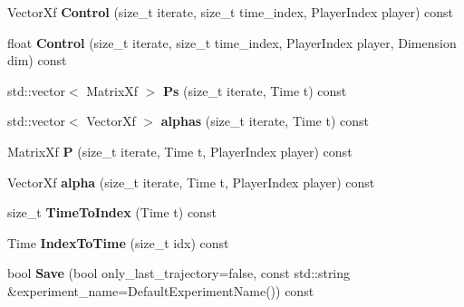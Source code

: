 \begin{DoxyCompactItemize}
\item 
Vector\+Xf {\bfseries Control} (size\+\_\+t iterate, size\+\_\+t time\+\_\+index, Player\+Index player) const \hypertarget{classilqgames_1_1_solver_log_a7bfdf2a7a7ced357eafcd36e009425d3}{}\label{classilqgames_1_1_solver_log_a7bfdf2a7a7ced357eafcd36e009425d3}

\item 
float {\bfseries Control} (size\+\_\+t iterate, size\+\_\+t time\+\_\+index, Player\+Index player, Dimension dim) const \hypertarget{classilqgames_1_1_solver_log_a73a740dd13e6f8c3c8359294e7662687}{}\label{classilqgames_1_1_solver_log_a73a740dd13e6f8c3c8359294e7662687}

\item 
std\+::vector$<$ Matrix\+Xf $>$ {\bfseries Ps} (size\+\_\+t iterate, Time t) const \hypertarget{classilqgames_1_1_solver_log_ae958cea078e821259eed40c26904bfbf}{}\label{classilqgames_1_1_solver_log_ae958cea078e821259eed40c26904bfbf}

\item 
std\+::vector$<$ Vector\+Xf $>$ {\bfseries alphas} (size\+\_\+t iterate, Time t) const \hypertarget{classilqgames_1_1_solver_log_a995476b2148f34878345d42ab9fbbc53}{}\label{classilqgames_1_1_solver_log_a995476b2148f34878345d42ab9fbbc53}

\item 
Matrix\+Xf {\bfseries P} (size\+\_\+t iterate, Time t, Player\+Index player) const \hypertarget{classilqgames_1_1_solver_log_a9074054ada0fbcc9b59b073d65252dd7}{}\label{classilqgames_1_1_solver_log_a9074054ada0fbcc9b59b073d65252dd7}

\item 
Vector\+Xf {\bfseries alpha} (size\+\_\+t iterate, Time t, Player\+Index player) const \hypertarget{classilqgames_1_1_solver_log_ac621cbe5639cf7ed168677404311efed}{}\label{classilqgames_1_1_solver_log_ac621cbe5639cf7ed168677404311efed}

\item 
size\+\_\+t {\bfseries Time\+To\+Index} (Time t) const \hypertarget{classilqgames_1_1_solver_log_ac4e09ac795276835d047795ff4ebffc7}{}\label{classilqgames_1_1_solver_log_ac4e09ac795276835d047795ff4ebffc7}

\item 
Time {\bfseries Index\+To\+Time} (size\+\_\+t idx) const \hypertarget{classilqgames_1_1_solver_log_a5ab947d807b26ae2f10663e34af24f23}{}\label{classilqgames_1_1_solver_log_a5ab947d807b26ae2f10663e34af24f23}

\item 
bool {\bfseries Save} (bool only\+\_\+last\+\_\+trajectory=false, const std\+::string \&experiment\+\_\+name=Default\+Experiment\+Name()) const \hypertarget{classilqgames_1_1_solver_log_a28367e891af240b563417a8bd6c8127e}{}\label{classilqgames_1_1_solver_log_a28367e891af240b563417a8bd6c8127e}

\end{DoxyCompactItemize}


